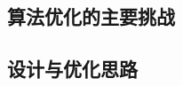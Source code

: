 \documentclass[degree=doctor]{thuthesis}
\begin{document}
\subsection{算法优化的主要挑战}
\subsection{设计与优化思路}
    
%
%


\backmatter

\listoffigures
\listoftables
\listofequations



% 





%



%
\end{document}
